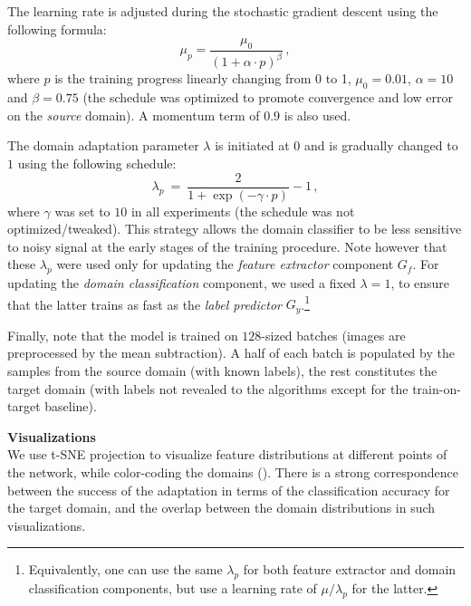 

The learning rate is adjusted during the stochastic gradient descent  using the following formula:
\begin{equation*}
  \mu_p = \frac{\mu_0}{(1 + \alpha \cdot p)^\beta} \, , 
\end{equation*}
where $ p $ is the training progress linearly changing from 0 to 1, $ \mu_0 = 0.01 $, $ \alpha = 10 $ and $ \beta = 0.75 $ (the schedule was optimized to promote convergence and low error on the \emph{source} domain). A momentum term of $0.9$ is also used.

The domain adaptation parameter $\lambda$ is initiated at $0$ and is gradually changed  to $1$ using the following schedule:
\begin{equation*}
  \lambda_p \ =\ \frac{2}{1 + \exp(-\gamma \cdot p)} - 1\,,
\end{equation*}
where $\gamma$ was set to $10$ in all experiments (the schedule was not optimized/tweaked). 
This strategy allows the domain classifier to be less sensitive to noisy signal at the early stages of the training procedure.
Note however that these $\lambda_p$ were used only for updating the \emph{feature extractor} component $G_f$. For updating the \emph{domain classification} component, we used a fixed $\lambda=1$, to ensure that the latter trains as fast as the \emph{label predictor} $G_y$.\footnote{Equivalently, one can use the same $\lambda_p$ for both feature extractor and domain classification components, but use a learning rate of $\mu/\lambda_p$ for the latter.}


Finally, note that the model is trained on $128$-sized batches (images are preprocessed by the mean subtraction). A half of each batch is populated by the samples from the source domain (with known labels), the rest constitutes the target domain (with labels not revealed to the algorithms except for the train-on-target baseline).

\bigskip
\indent\textbf{Visualizations}\\
We use t-SNE \citep{maaten2008visualizing} projection to visualize feature distributions at different points of the network, while color-coding the domains (). 
There is a strong correspondence between the success of the adaptation in terms of the classification accuracy for the target domain, and the overlap between the domain distributions in such visualizations.

